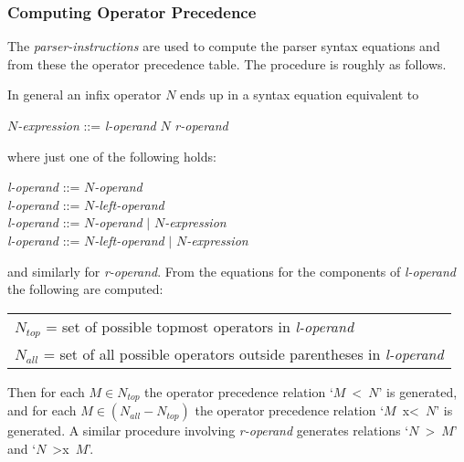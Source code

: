 \documentclass[12pt]{article}
\begin{document}
\subsubsection{Computing Operator Precedence}
\label{COMPUTING-OPERATOR-PRECEDENCE}

The {\em parser-instructions} are used to compute the parser
syntax equations and from these the operator
precedence table.  The procedure is roughly as follows.

In general an infix operator $N$ ends up in a syntax equation equivalent to
\begin{center}
{\em $N$-expression} ::= {\em l-operand} $N$ {\em r-operand}
\end{center}
where just one of the following holds:
\begin{center}
{\em l-operand} ::= {\em $N$-operand} \\
{\em l-operand} ::= {\em $N$-left-operand} \\
{\em l-operand} ::= {\em $N$-operand} $|$ {\em $N$-expression } \\
{\em l-operand} ::= {\em $N$-left-operand} $|$ {\em $N$-expression }
\end{center}
and similarly for {\em r-operand}.
From the equations for the components of {\em l-operand} the following
are computed:
\begin{center}
\begin{tabular}{l}
$N_{top}$ = set of possible topmost operators in {\em l-operand} \\
$N_{all}$ = set of all possible operators outside parentheses
           in {\em l-operand}
\end{tabular}
\end{center}

Then for each $M\in{}N_{top}$ the operator precedence relation
`$M$~<~$N$' is generated, and for each $M\in(N_{all}-N_{top})$
the operator precedence relation
`$M$~x<~$N$' is generated.  A similar procedure involving {\em r-operand}
generates relations `$N$~>~$M$' and `$N$~>x~$M$'.
\end{document}
